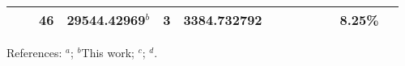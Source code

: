 \begin{table*}
\begin{center}
{\begin{tabular}{:l;l;c;l;c;l;c;l;l;c;c;c;c}
\rowstyle{\itshape}               &        & 46        & 29544.42969$^{b}$                & 3 &   3384.732792      &      & $                                        $ & $                                        $ & $      $ &              & 8.25\%    & $          $\\
\hline
\end{tabular}
}
{\footnotesize References:
$^{a}$\citet{Ruffoni:2010:424};
$^{b}$This work;
$^{c}$\citet{Aldenius:2009:014008};
$^{d}$\citet{Nave:2012:1570}.}
\end{center}
\end{table*}
